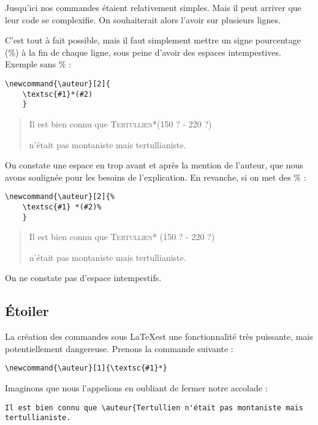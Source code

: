 Jusqu'ici nos commandes étaient relativement simples. Mais il peut arriver que leur code se complexifie. On souhaiterait alors l'avoir sur plusieurs lignes.

C'est tout à fait possible, mais il faut simplement mettre  un signe pourcentage (\%) à la fin de chaque ligne, sous peine d'avoir  des espaces intempestives. Exemple sans  \% :

\begin{verbatim}
\newcommand{\auteur}[2]{
	\textsc{#1}*(#2)
	}
\end{verbatim}

\renewcommand{\auteur}[2]{\underline{ }%
	\textsc{#1}*(#2)\underline{ }%
}

\begin{quotation}
Il est bien connu que \auteur{Tertullien}{150 ? - 220 ?}
n'était pas montaniste mais tertullianiste.
\end{quotation}

On constate une espace en trop avant et après la mention de l'auteur, que nous avons soulignée pour les besoins de l'explication.
En revanche, si on met des \% :

\begin{verbatim}
\newcommand{\auteur}[2]{%
	\textsc{#1} *(#2)%
	}
\end{verbatim}

\renewcommand{\auteur}[2]{%
	\textsc{#1}* (#2)%
}

\begin{quotation}
Il est bien connu que \auteur{Tertullien}{150 ? - 220 ?}
n'était pas montaniste mais tertullianiste.
\end{quotation}

On ne constate pas d'espace intempestifs.


\subsection{Étoiler }

La création des commandes sous \LaTeX est une fonctionnalité très puissante, mais potentiellement dangereuse. Prenons la commande suivante :

\begin{verbatim}
\newcommand{\auteur}[1]{\textsc{#1}*}
\end{verbatim}

Imaginons que nous l'appelions en oubliant de fermer notre accolade :

\begin{verbatim}
Il est bien connu que \auteur{Tertullien n'était pas montaniste mais tertullianiste.
\end{verbatim}


